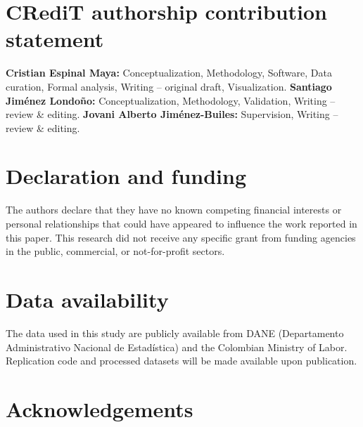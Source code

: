 \documentclass[5p,times,authoryear]{elsarticle}
\begin{document}
\FloatBarrier


\section*{CRediT authorship contribution statement}

\textbf{Cristian Espinal Maya:} Conceptualization, Methodology, Software, Data curation, Formal analysis, Writing -- original draft, Visualization.
\textbf{Santiago Jim\'enez Londo\~no:} Conceptualization, Methodology, Validation, Writing -- review \& editing.
\textbf{Jovani Alberto Jim\'enez-Builes:} Supervision, Writing -- review \& editing.

\section*{Declaration and funding}

The authors declare that they have no known competing financial interests or personal relationships that could have appeared to influence the work reported in this paper. This research did not receive any specific grant from funding agencies in the public, commercial, or not-for-profit sectors.

\section*{Data availability}

The data used in this study are publicly available from DANE (Departamento Administrativo Nacional de Estad\'istica) and the Colombian Ministry of Labor. Replication code and processed datasets will be made available upon publication.

\section*{Acknowledgements}
\end{document}
